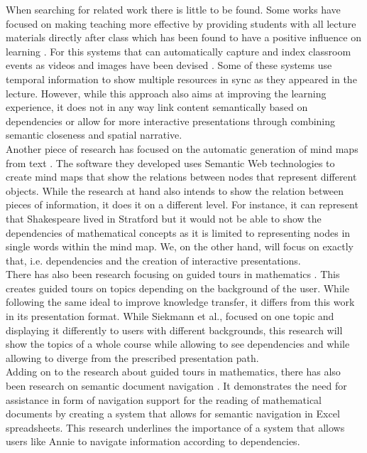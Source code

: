 \documentclass[twoside, 12pt]{article}
\begin{document}
When searching for related work there is little to be found. Some works have focused on making teaching more effective by providing students with all lecture materials directly after class which has been found to have a positive influence on learning \cite{DBLP:dblp_journals/tochi/BrothertonA04}. For this systems that can automatically capture and index classroom events as videos and images have been devised \cite{indexedclass:npentrel14}. Some of these systems use temporal information \cite{DBLP:dblp_journals/isci/ChungS97} to show multiple resources in sync as they appeared in the lecture. However, while this approach also aims at improving the learning experience, it does not in any way link content semantically based on dependencies or allow for more interactive presentations through combining semantic closeness and spatial narrative.\\

Another piece of research has focused on the automatic generation of mind maps from text \cite{abdeen2009direct}. The software they developed uses Semantic Web technologies to create mind maps that show the relations between nodes that represent different objects. While the research at hand also intends to show the relation between pieces of information, it does it on a different level. For instance, it can represent that Shakespeare lived in Stratford but it would not be able to show the dependencies of mathematical concepts as it is limited to representing nodes in single words within the mind map. We, on the other hand, will focus on exactly that, i.e. dependencies and the creation of interactive presentations.\\

There has also been research focusing on guided tours in mathematics \cite{SieBen:acgap00}. This creates guided tours on topics depending on the background of the user. While following the same ideal to improve knowledge transfer, it differs from this work in its presentation format. While Siekmann et al., focused on one topic and displaying it differently to users with different backgrounds, this research will show the topics of a whole course while allowing to see dependencies and while allowing to diverge from the prescribed presentation path.\\

Adding on to the research about guided tours in mathematics, there has also been research on semantic document navigation \cite{Koh:NavigationInMathDocs2012}. It demonstrates the need for assistance in form of navigation support for the reading of mathematical documents by creating a system that allows for semantic navigation in Excel spreadsheets. This research underlines the importance of a system that allows users like Annie to navigate information according to dependencies.\\
  
\end{document}
